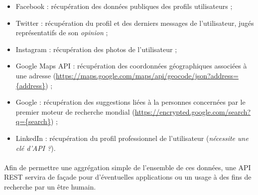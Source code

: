 \begin{itemize}
    \item Facebook : récupération des données publiques des profils utilisateurs ;
    \item Twitter : récupération du profil et des derniers messages de l'utilisateur, jugés
    représentatifs de son \emph{opinion} ;
    \item Instagram : récupération des photos de l'utilisateur ; 
    \item Google Maps API : récupération des coordonnées géographiques associées à une adresse
    (\url{https://maps.google.com/maps/api/geocode/json?address={address}}) ;
    \item Google : récupération des suggestions liées à la personnes concernées par le
    premier moteur de recherche mondial (\url{https://encrypted.google.com/search?q={search}}) ;
    \item LinkedIn : récupération du profil professionnel de l'utilisateur (\emph{nécessite une clé d'API ?}).
\end{itemize}

\paragraph{} Afin de permettre une aggrégation simple de l'ensemble de ces données, une 
API REST servira de façade pour d'éventuelles applications ou un usage à des fins de recherche
par un être humain.